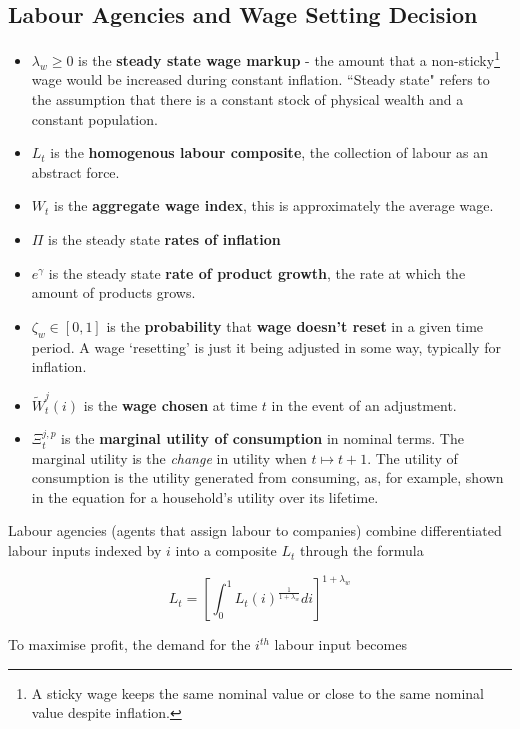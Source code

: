 \documentclass[notitlepage,12pt]{report}
\begin{document}
\begin{appendices}
	\subsection{Labour Agencies and Wage Setting Decision}
	
	\begin{itemize}
		\item \(\lambda_w\geq0\) is the {\bf steady state wage markup} - the amount that a non-sticky\footnote{A sticky wage keeps the same nominal value or close to the same nominal value despite inflation.} wage would be increased during constant inflation. ``Steady state" refers to the assumption that there is a constant stock of physical wealth and a constant population.
		\item \(L_t\) is the {\bf homogenous labour composite}, the collection of labour as an abstract force.
		\item \(W_t\) is the {\bf aggregate wage index}, this is approximately the average wage.
		\item \(\Pi\) is the steady state {\bf rates of inflation}
		\item \(e^\gamma\) is the steady state {\bf rate of product growth}, the rate at which the amount of products grows.
		\item \(\zeta_w\in[0,1]\) is the {\bf probability} that {\bf wage doesn't reset} in a given time period. A wage `resetting' is just it being adjusted in some way, typically for inflation.
		\item \(\tilde{W}_t^j(i)\) is the {\bf wage chosen} at time \(t\) in the event of an adjustment.
		\item \(\Xi_t^{j,p}\) is the {\bf marginal utility of consumption} in nominal terms. The marginal utility is the {\it change} in utility when \(t\mapsto t+1\). The utility of consumption is the utility generated from consuming, as, for example, shown in the equation for a household's utility over its lifetime.
	\end{itemize}
	
	Labour agencies (agents that assign labour to companies) combine differentiated labour inputs indexed by \(i\) into a composite \(L_t\) through the formula
	
	\begin{equation}
	L_t=\left[\int_0^1 L_t(i)^{\frac{1}{1+\lambda_w}}di\right]^{1+\lambda_w}
	\end{equation}
	
	To maximise profit, the demand for the \(i^{th}\) labour input becomes
	

\end{appendices}
\end{document}
